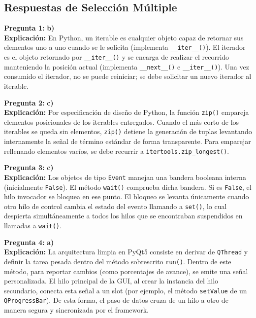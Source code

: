 \documentclass[12pt,letterpaper]{article}
\begin{document}
\subsection*{Respuestas de Selección Múltiple}

\textbf{Pregunta 1:} \textbf{b)} \\
\textbf{Explicación:} En Python, un iterable es cualquier objeto capaz de retornar sus elementos uno a uno cuando se le solicita (implementa \texttt{\_\_iter\_\_()}). El iterador es el objeto retornado por \texttt{\_\_iter\_\_()} y se encarga de realizar el recorrido manteniendo la posición actual (implementa \texttt{\_\_next\_\_()} e \texttt{\_\_iter\_\_()}). Una vez consumido el iterador, no se puede reiniciar; se debe solicitar un nuevo iterador al iterable.

\medskip

\textbf{Pregunta 2:} \textbf{c)} \\
\textbf{Explicación:} Por especificación de diseño de Python, la función \texttt{zip()} empareja elementos posicionales de los iterables entregados. Cuando el más corto de los iterables se queda sin elementos, \texttt{zip()} detiene la generación de tuplas levantando internamente la señal de término estándar de forma transparente. Para emparejar rellenando elementos vacíos, se debe recurrir a \texttt{itertools.zip\_longest()}.

\medskip

\textbf{Pregunta 3:} \textbf{c)} \\
\textbf{Explicación:} Los objetos de tipo \texttt{Event} manejan una bandera booleana interna (inicialmente \texttt{False}). El método \texttt{wait()} comprueba dicha bandera. Si es \texttt{False}, el hilo invocador se bloquea en ese punto. El bloqueo se levanta únicamente cuando otro hilo de control cambia el estado del evento llamando a \texttt{set()}, lo cual despierta simultáneamente a todos los hilos que se encontraban suspendidos en llamadas a \texttt{wait()}.

\medskip

\textbf{Pregunta 4:} \textbf{a)} \\
\textbf{Explicación:} La arquitectura limpia en PyQt5 consiste en derivar de \texttt{QThread} y definir la tarea pesada dentro del método sobrescrito \texttt{run()}. Dentro de este método, para reportar cambios (como porcentajes de avance), se emite una señal personalizada. El hilo principal de la GUI, al crear la instancia del hilo secundario, conecta esta señal a un slot (por ejemplo, el método \texttt{setValue} de un \texttt{QProgressBar}). De esta forma, el paso de datos cruza de un hilo a otro de manera segura y sincronizada por el framework.
\end{document}
